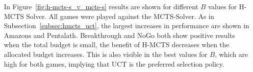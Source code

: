 \documentclass{icga}
\begin{document}


In Figure~\ref{fig:h-mcts-s_v_mcts-s} results are shown for different $B$ values for H-MCTS Solver. All games were played against the MCTS-Solver. As in Subsection~\ref{subsec:hmcts_uct}, the largest increases in performance are shown in Amazons and Pentalath. Breakthrough and NoGo both show positive results when the total budget is small, the benefit of H-MCTS decreases when the allocated budget increases. This is also visible in the best values for $B$, which are high for both games, implying that UCT is the preferred selection policy.

\begin{table}[ht]
\centering
\captionsetup{justification=centering,margin=1cm}
\tabcolsep=0.3cm
\end{table}
\end{document}
